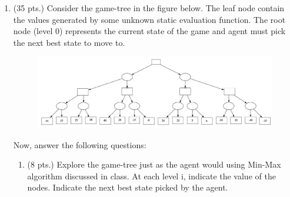\documentclass{article}%
\begin{document}
\begin{enumerate}
	
	\item (35 pts.) Consider the game-tree in the figure below. The leaf node contain the values generated by some unknown static evaluation function. The root node (level 0) represents the current state of the game and agent must pick the next best state to move to.
\begin{figure}[h]
\begin{center}
  \includegraphics[scale=0.3]{tree.png}
\end{center}
\end{figure}

Now, answer the following questions: \\
	\begin{enumerate}
  		\item (8 pts.) Explore the game-tree just as the agent would using Min-Max algorithm discussed in class. At each level i, indicate the value of the nodes. Indicate the next best state picked by the agent.
  		

\end{enumerate}
\end{enumerate}
\end{document}
